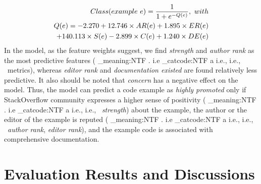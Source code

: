 \documentclass[conference]{IEEEtran}
\makeatletter
\newcommand\latinabbrev[1]{
  \peek_meaning:NTF . {%
    #1\@}%
  { \peek_catcode:NTF a {%
      #1., \@ }%
    {#1., \@}}}
\def\ie{\latinabbrev{i.e}}
\makeatother
\begin{document}
\begin{equation*}\label{eq:model}
\setlength{\abovedisplayskip}{0pt}
\setlength{\belowdisplayskip}{0pt}
\begin{split}
Class(example~e)=\frac{1}{1+e^{-Q(e)}}, ~with \\
Q(e)= -2.270+ 12.746\times AR(e) +1.895\times ER(e)\\+140.113\times S(e) -2.899\times C(e)
+1.240\times DE(e)
\end{split}
\end{equation*}
In the model, as the feature weights suggest, we find \emph{strength} and \emph{author rank} as the most predictive features (\ie\ metrics), whereas \emph{editor rank} and \emph{documentation existed} are found relatively less predictive. It also should be noted that \emph{concern} has a negative effect on the model. Thus, the model can predict a code example as \emph{highly promoted} only if StackOverflow community expresses a higher sense of positivity (\ie\ \emph{strength}) about the example, the author or the editor of the example is reputed (\ie\ \emph{author rank}, \emph{editor rank}), and the example code is associated with comprehensive documentation.  

\vspace{-.1cm}
\section{Evaluation Results and Discussions}
\label{sec:experiment}
\end{document}
